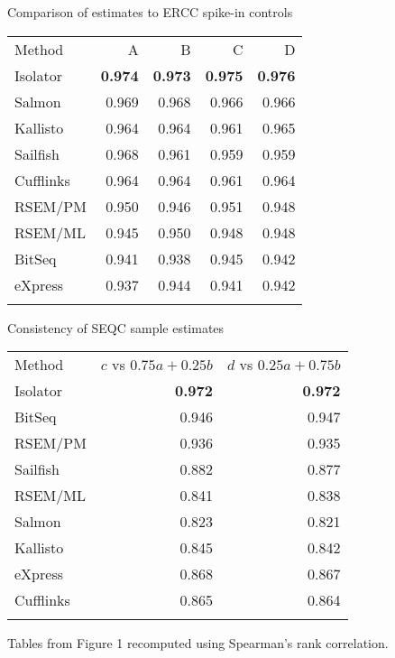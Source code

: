 \documentclass{article}
\begin{document}
\begin{figure*}
\begin{subtable}{0.5\linewidth}
\caption{Comparison of estimates to ERCC spike-in controls}
\begin{tabular}[c]{@{}lrrrr@{}}
\toprule\addlinespace
Method & A & B & C & D
\\\addlinespace
\midrule
Isolator  & \textbf{0.974} & \textbf{0.973} & \textbf{0.975} & \textbf{0.976}
\\\addlinespace
Salmon    & 0.969 & 0.968 & 0.966 & 0.966
\\\addlinespace
Kallisto  & 0.964 & 0.964 & 0.961 & 0.965
\\\addlinespace
Sailfish  & 0.968 & 0.961 & 0.959 & 0.959
\\\addlinespace
Cufflinks & 0.964 & 0.964 & 0.961 & 0.964
\\\addlinespace
RSEM/PM   & 0.950 & 0.946 & 0.951 & 0.948
\\\addlinespace
RSEM/ML   & 0.945 & 0.950 & 0.948 & 0.948
\\\addlinespace
BitSeq    & 0.941 & 0.938 & 0.945 & 0.942
\\\addlinespace
eXpress   & 0.937 & 0.944 & 0.941 & 0.942
\\\addlinespace
\bottomrule
\addlinespace
\end{tabular}
\label{table:ercc:spearman}
\end{subtable}
\begin{subtable}{0.5\linewidth}
\caption{Consistency of SEQC sample estimates}
\begin{tabular}[c]{@{}lrr@{}}
\toprule\addlinespace
Method & $c$ vs $0.75a + 0.25b$ & $d$ vs $0.25a + 0.75b$
\\\addlinespace
\midrule
Isolator  & \textbf{0.972} & \textbf{0.972}
\\\addlinespace
BitSeq    & 0.946 & 0.947
\\\addlinespace
RSEM/PM   & 0.936 & 0.935
\\\addlinespace
Sailfish  & 0.882 & 0.877
\\\addlinespace
RSEM/ML   & 0.841 & 0.838
\\\addlinespace
Salmon    & 0.823 & 0.821
\\\addlinespace
Kallisto  & 0.845 & 0.842
\\\addlinespace
eXpress   & 0.868 & 0.867
\\\addlinespace
Cufflinks & 0.865 & 0.864
\\\addlinespace
\bottomrule
\addlinespace
\end{tabular}
\label{table:seqctranscripts:spearman}
\end{subtable}

\caption{
Tables from Figure 1 recomputed using Spearman's rank correlation.
}
\end{figure*}
\end{document}
